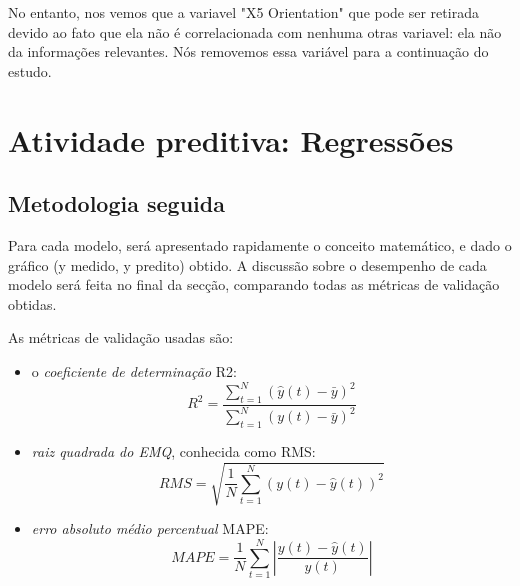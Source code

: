 \documentclass[paper=a4, fontsize=11pt]{article} %
\numberwithin{equation}{section} %
\numberwithin{figure}{section} %
\numberwithin{table}{section} %
\begin{document}
No entanto, nos vemos que a variavel "X5 Orientation" que pode ser retirada devido ao fato que ela não é correlacionada com nenhuma otras variavel:
ela não da informações relevantes.
Nós removemos essa variável para a continuação do estudo.


\newcommand{\norme}[1]{\left\Vert #1\right\Vert}
\newcommand{\abs}[1]{\left\vert #1\right\vert}
\newpage
\section{Atividade preditiva: Regressões}

\subsection{Metodologia seguida}

Para cada modelo, será apresentado rapidamente o conceito matemático, e dado o gráfico (y medido, y predito) obtido.\newline
A discussão sobre o desempenho de cada modelo será feita no final da secção, comparando todas as métricas de validação obtidas.\newline

As métricas de validação usadas são:
\begin{itemize}
\item o \emph{coeficiente de determinação} R2:
    \begin{equation}
    R^{2} = \frac{\sum_{t=1}^{N} (\hat{y}(t) - \bar{y})^2}{\sum_{t=1}^{N} (y(t) - \bar{y})^2}
    \end{equation}
\item \emph{raiz quadrada do EMQ}, conhecida como RMS:
    \begin{equation}
    RMS = \sqrt{\frac{1}{N}\sum_{t=1}^{N} (y(t) - \hat{y}(t))^2}
    \end{equation}
\item \emph{erro absoluto médio percentual} MAPE:
    \begin{equation}
    MAPE = \frac{1}{N}\sum_{t=1}^{N} \abs{\frac{y(t) - \hat{y}(t)}{y(t)}}
    \end{equation}
\end{itemize}
\end{document}
